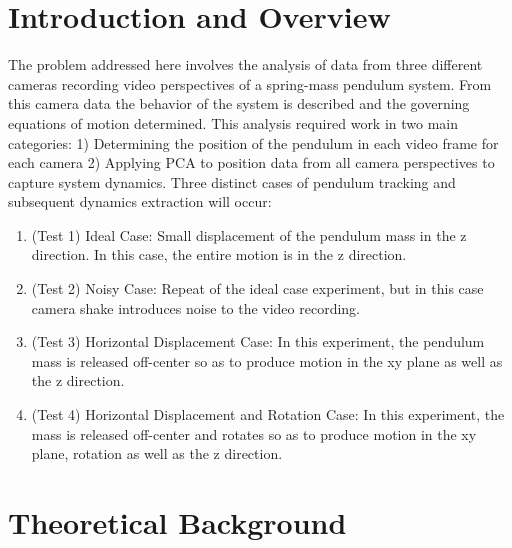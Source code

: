 \documentclass{article}
\begin{document}
\section{Introduction and Overview}
The problem addressed here involves the analysis of data from three different cameras recording video perspectives of a spring-mass pendulum system. From this camera data the behavior of the system is described and the governing equations of motion determined. This analysis required work in two main categories: 1) Determining the position of the pendulum in each video frame for each camera 2) Applying PCA to position data from all camera perspectives to capture system dynamics. Three distinct cases of pendulum tracking and subsequent dynamics extraction will occur:
\begin{enumerate}
    \item (Test 1) Ideal Case: Small displacement of the pendulum mass in the z direction. In this case, the entire motion is in the z direction.
    \item (Test 2) Noisy Case: Repeat of the ideal case experiment, but in this case camera shake introduces noise to the video recording.
    \item (Test 3) Horizontal Displacement Case: In this experiment, the pendulum mass is released off-center so as to produce motion in the xy plane as well as the z direction.
    \item (Test 4) Horizontal Displacement and Rotation Case: In this experiment, the mass is released off-center and rotates so as to produce motion in the xy plane, rotation as well as the z direction.
\end{enumerate}

\section{Theoretical Background}
\end{document}
